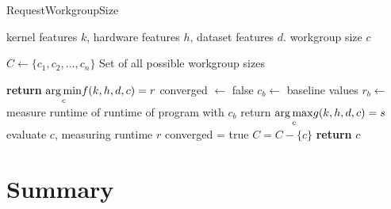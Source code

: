 \begin{algorithm}
\caption{RequestWorkgroupSize}\label{bar}
\begin{algorithmic}[1]
\Require kernel features $k$, hardware features $h$, dataset features $d$.
\Ensure workgroup size $c$

\State $C \leftarrow \{ c_1, c_2,\ldots, c_n \}$
\Comment Set of all possible workgroup sizes

    \State \textbf{return} $\underset{c}{\operatorname*{arg\,min}} f(k,h,d,c) = r$
\Else
   \State converged $\leftarrow$ false
   \State $c_b \leftarrow$ baseline values
   \State $r_b \leftarrow$ measure runtime of runtime of program with $c_b$
     \State return $\underset{c}{\operatorname*{arg\,max}} g(k,h,d,c) = s$
     \State evaluate $c$, measuring runtime $r$\;
       \State converged = true
     \Else
       \State $C = C - \{c\}$
     \EndIf
   \EndWhile
   \State \textbf{return} $c$
\EndIf
\end{algorithmic}
\end{algorithm}

\section{Summary}
